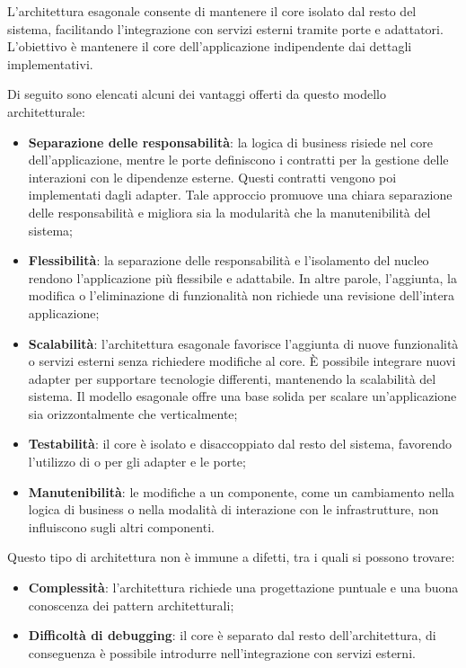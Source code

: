 \vspace{0.5\baselineskip}
\par L'architettura esagonale consente di mantenere il core isolato dal resto del sistema, facilitando l'integrazione con servizi esterni tramite porte e adattatori. L'obiettivo è mantenere il core dell'applicazione indipendente dai dettagli implementativi.
\par Di seguito sono elencati alcuni dei vantaggi offerti da questo modello architetturale:
\begin{itemize}
    \item \textbf{Separazione delle responsabilità}: la logica di business risiede nel core dell'applicazione, mentre le porte definiscono i contratti per la gestione delle interazioni con le dipendenze esterne. Questi contratti vengono poi implementati dagli adapter. Tale approccio promuove una chiara separazione delle responsabilità e migliora sia la modularità che la manutenibilità del sistema;
    \item \textbf{Flessibilità}: la separazione delle responsabilità e l'isolamento del nucleo rendono l'applicazione più flessibile e adattabile. In altre parole, l'aggiunta, la modifica o l'eliminazione di funzionalità non richiede una revisione dell'intera applicazione;
    \item \textbf{Scalabilità}: l'architettura esagonale favorisce l'aggiunta di nuove funzionalità o servizi esterni senza richiedere modifiche al core. È possibile integrare nuovi adapter per supportare tecnologie differenti, mantenendo la scalabilità del sistema. Il modello esagonale offre una base solida per scalare un'applicazione sia orizzontalmente che verticalmente;
    \item \textbf{Testabilità}: il core è isolato e disaccoppiato dal resto del sistema, favorendo l'utilizzo di  o  per gli adapter e le porte;
    \item \textbf{Manutenibilità}: le modifiche a un componente, come un cambiamento nella logica di business o nella modalità di interazione con le infrastrutture, non influiscono sugli altri componenti.
\end{itemize}

\vspace{0.5\baselineskip}
\par Questo tipo di architettura non è immune a difetti, tra i quali si possono trovare:
\begin{itemize}
    \item \textbf{Complessità}: l'architettura richiede una progettazione puntuale e una buona conoscenza dei pattern architetturali;
    \item \textbf{Difficoltà di debugging}: il core è separato dal resto dell'architettura, di conseguenza è possibile introdurre  nell'integrazione con servizi esterni.
\end{itemize}

